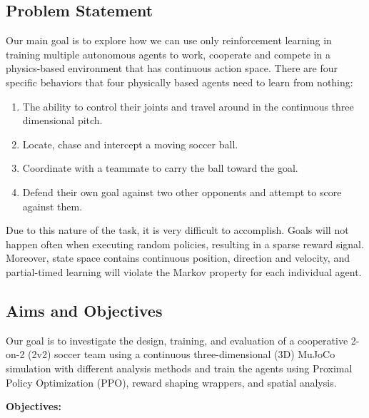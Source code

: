 \subsection{Problem Statement}
\label{sec:intro_prob_art}

Our main goal is to explore how we can use only reinforcement learning in training multiple 
autonomous agents to work, cooperate and compete in a physics-based environment that has 
continuous action space. There are four specific behaviors that four physically based agents 
need to learn from nothing:

\begin{enumerate}
    \item The ability to control their joints and travel around in the continuous three 
    dimensional pitch.
    \item Locate, chase and intercept a moving soccer ball.
    \item Coordinate with a teammate to carry the ball toward the goal.
    \item Defend their own goal against two other opponents and attempt to score against them.
\end{enumerate}

Due to this nature of the task, it is very difficult to accomplish. Goals will not happen 
often when executing random policies, resulting in a sparse reward signal. Moreover, state 
space contains continuous position, direction and velocity, and partial-timed learning will 
violate the Markov property for each individual agent.

\subsection{Aims and Objectives}
\label{sec:intro_aims_obj}

Our goal is to investigate the design, training, and evaluation of a cooperative 2-on-2 (2v2) 
soccer team using a continuous three-dimensional (3D) MuJoCo simulation with different analysis 
methods and train the agents using Proximal Policy Optimization (PPO), reward shaping wrappers, 
and spatial analysis.

\textbf{Objectives:}


